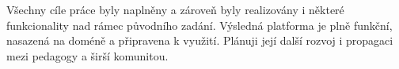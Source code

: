 Všechny cíle práce byly naplněny a zároveň byly realizovány i některé funkcionality nad rámec původního zadání. 
Výsledná platforma je plně funkční, nasazená na doméně a připravena k využití. 
Plánuji její další rozvoj i propagaci mezi pedagogy a širší komunitou.











